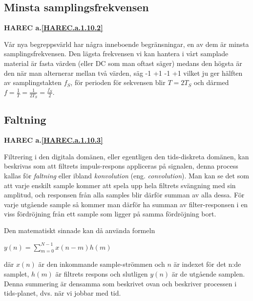\subsection{Minsta samplingsfrekvensen}
\textbf{HAREC a.\ref{HAREC.a.1.10.2}\label{myHAREC.a.1.10.2}}


Vår nya begreppsvärld har några inneboende begränsningar, en av dem är minsta
samplingsfrekvensen.
Den lägsta frekvensen vi kan hantera i vårt samplade material är fasta värden
(eller DC som man oftast säger) medans den högsta är den när man alternerar
mellan två värden, säg -1 +1 -1 +1 vilket ju ger hälften av samplingstakten
\(f_S\), för perioden för sekvensen blir \(T = 2T_S\) och därmed
\(f=\frac{1}{T}=\frac{1}{2T_S}=\frac{f_S}{2}\).

\subsection{Faltning}
\textbf{HAREC a.\ref{HAREC.a.1.10.3}\label{myHAREC.a.1.10.3}}

Filtrering i den digitala domänen, eller egentligen den tids-diskreta domänen,
kan beskrivas som att filtrets impuls-respons appliceras på signalen, denna
process kallas för \emph{faltning} eller ibland \emph{konvolution} (eng.
\emph{convolution}).
Man kan se det som att varje enskilt sample kommer att spela upp hela filtrets
svängning med sin amplitud, och responsen från alla samples blir därför summan
av alla dessa.
För varje utgående sample så kommer man därför ha summan av filter-responsen
i en viss fördröjning från ett sample som ligger på samma fördröjning bort.

Den matematiskt sinnade kan då använda formeln

\(y(n) = \sum_{m=0}^{N-1} x(n-m)h(m)\)

där \(x(n)\) är den inkommande sample-strömmen och \(n\) är indexet för det
n:de samplet, \(h(m)\) är filtrets respons och slutligen \(y(n)\) är de utgående
samplen.
Denna summering är densamma som beskrivet ovan och beskriver processen
i tids-planet, dvs. när vi jobbar med tid.


